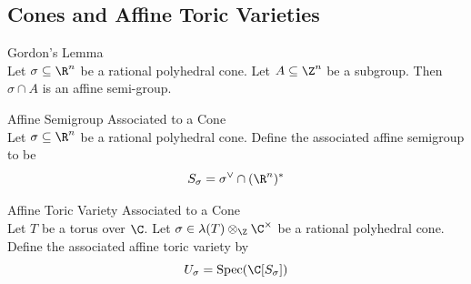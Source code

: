 \documentclass[a4paper]{article}
\begin{document}
\subsection{Cones and Affine Toric Varieties}
\begin{lmm}{Gordon's Lemma}{}\\
Let $\sigma\subseteq\R^n$ be a rational polyhedral cone. Let $A\subseteq\Z^n$ be a subgroup. Then $\sigma\cap A$ is an affine semi-group. 
\end{lmm}

\begin{defn}{Affine Semigroup Associated to a Cone}{}\\
Let $\sigma\subseteq\R^n$ be a rational polyhedral cone. Define the associated affine semigroup to be $$S_\sigma=\sigma^\vee\cap(\R^n)^\ast$$
\end{defn}

\begin{defn}{Affine Toric Variety Associated to a Cone}{}\\
Let $T$ be a torus over $\C$. Let $\sigma\in\lambda(T)\otimes_\Z\C^\times$ be a rational polyhedral cone. Define the associated affine toric variety by $$U_\sigma=\text{Spec}(\C[S_\sigma])$$
\end{defn}
\end{document}
